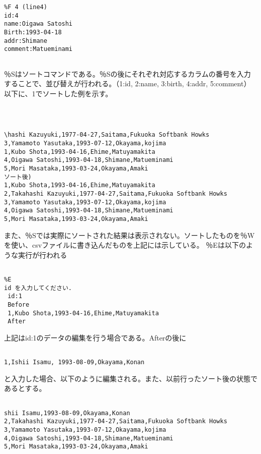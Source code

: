 \documentclass[a4j]{jarticle}
\begin{document}
\begin{enumerate}
{\begin{verbatim}
%F 4 (line4)
id:4
name:Oigawa Satoshi
Birth:1993-04-18
addr:Shimane
comment:Matueminami


\end{verbatim}
}

％Sはソートコマンドである。％Sの後にそれぞれ対応するカラムの番号を入力することで、並び替えが行われる。（1:id, 2:name, 3:birth, 4:addr, 5:comment）以下に、1でソートした例を示す。


{\baselineskip 3mm
\begin{verbatim}



\hashi Kazuyuki,1977-04-27,Saitama,Fukuoka Softbank Howks
3,Yamamoto Yasutaka,1993-07-12,Okayama,kojima
1,Kubo Shota,1993-04-16,Ehime,Matuyamakita
4,Oigawa Satoshi,1993-04-18,Shimane,Matueminami
5,Mori Masataka,1993-03-24,Okayama,Amaki
ソート後)
1,Kubo Shota,1993-04-16,Ehime,Matuyamakita
2,Takahashi Kazuyuki,1977-04-27,Saitama,Fukuoka Softbank Howks
3,Yamamoto Yasutaka,1993-07-12,Okayama,kojima
4,Oigawa Satoshi,1993-04-18,Shimane,Matueminami
5,Mori Masataka,1993-03-24,Okayama,Amaki

\end{verbatim}
}

また、％Sでは実際にソートされた結果は表示されない。ソートしたものを％Wを使い、csvファイルに書き込んだものを上記には示している。
％Eは以下のような実行が行われる

{\baselineskip 3mm
\begin{verbatim}

%E
id を入力してください.
 id:1
 Before
 1,Kubo Shota,1993-04-16,Ehime,Matuyamakita
 After

\end{verbatim}
}

上記はid:1のデータの編集を行う場合である。Afterの後に

{\baselineskip 3mm
\begin{verbatim}

1,Ishii Isamu, 1993-08-09,Okayama,Konan

\end{verbatim}
}

と入力した場合、以下のように編集される。また、以前行ったソート後の状態であるとする。

{\baselineskip 3mm
\begin{verbatim}

shii Isamu,1993-08-09,Okayama,Konan
2,Takahashi Kazuyuki,1977-04-27,Saitama,Fukuoka Softbank Howks
3,Yamamoto Yasutaka,1993-07-12,Okayama,kojima
4,Oigawa Satoshi,1993-04-18,Shimane,Matueminami
5,Mori Masataka,1993-03-24,Okayama,Amaki


\end{verbatim}}
\end{enumerate}
\end{document}
